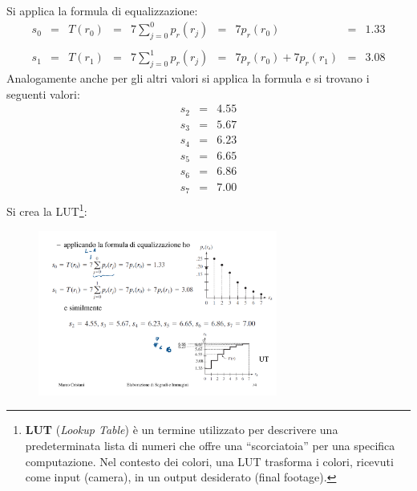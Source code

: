 \documentclass[a4paper]{article}
\newcommand{\dquotes}[1]{``#1''}
\begin{document}
	\noindent
	Si applica la formula di equalizzazione:
	\begin{equation*}
		\begin{array}{lllllllll}
			s_{0} & = & T\left(r_{0}\right) & = & 7\displaystyle\sum_{j=0}^{0} p_{r}\left(r_{j}\right) & = & 7p_{r}\left(r_{0}\right) & = & 1.33 \\
			&&&&&&&&\\
			s_{1} & = & T\left(r_{1}\right) & = & 7\displaystyle\sum_{j=0}^{1} p_{r}\left(r_{j}\right) & = & 7p_{r}\left(r_{0}\right) + 7p_{r}\left(r_{1}\right) & = & 3.08
		\end{array}
	\end{equation*}
	Analogamente anche per gli altri valori si applica la formula e si trovano i seguenti valori:
	\begin{equation*}
		\begin{array}{lll}
			s_{2} & = & 4.55 \\
			s_{3} & = & 5.67 \\
			s_{4} & = & 6.23 \\
			s_{5} & = & 6.65 \\
			s_{6} & = & 6.86 \\
			s_{7} & = & 7.00 \\
		\end{array}
	\end{equation*}
	Si crea la LUT\footnote{\textbf{LUT} (\emph{Lookup Table}) è un termine utilizzato per descrivere una predeterminata lista di numeri che offre una \dquotes{scorciatoia} per una specifica computazione. Nel contesto dei colori, una LUT trasforma i colori, ricevuti come input (camera), in un output desiderato (final footage).}:
	\begin{figure}[!htp]
		\centering
		\includegraphics[width=0.7\textwidth]{img/eg_equalizzazione.pdf}
	\end{figure}\newpage
	
\end{document}
